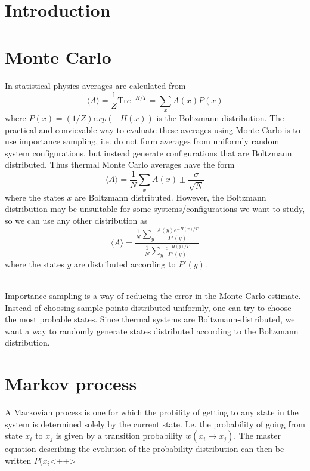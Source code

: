 \documentclass[a4paper]{article}
\newcommand{\trm}[1]{\textrm{#1}}
\begin{document}
\section{Introduction}
\section{Monte Carlo}
In statistical physics averages are calculated from 
\begin{equation}
  \langle A\rangle = \frac{1}{Z}\trm{Tr} e^{-H/T} = \sum_x A(x) P(x)
  \label{}
\end{equation}
where  $P(x) = (1/Z)exp(-H(x))$ is the Boltzmann distribution.
The practical and convievable way to evaluate these averages using Monte Carlo is to use importance sampling, i.e. do not form averages from uniformly random system configurations, but instead generate configurations that are Boltzmann distributed.   
Thus thermal Monte Carlo averages have the form 
\begin{equation}
  \langle A \rangle = \frac{1}{N} \sum_x A(x) \pm \frac{\sigma	}{\sqrt N}
  \label{}
\end{equation}
where the states $x$ are Boltzmann distributed.
However, the Boltzmann distribution may be unsuitable for some systems/configurations we want to study, so we can use any other distribution as 
\begin{equation}
  \langle A \rangle = \frac{\frac{1}{N}\sum_y \frac{A(y) e^{-H(x)/T}}{P'(y)}}{\frac{1}{N}\sum_y \frac{e^{-H(y)/T}}{P'(y)}}  
  \label{}
\end{equation}
 where the states $y$ are distributed according to $P'(y)$.

 \\
 Importance sampling is a way of reducing the error in the Monte Carlo estimate. Instead of choosing sample points distributed uniformly, one can try to choose the most probable states. Since thermal systems are Boltzmann-distributed, we want a way to randomly generate states distributed according to the Boltzmann distribution.
 \section{Markov process}
 A Markovian process is one for which the probility of getting to any state in the system is determined solely by the current state. I.e. the probability of going from state $x_i$ to $x_{j}$ is given by a transition probability $w(x_i \rightarrow x_j)$. The master equation describing the evolution of the probability distribution can then be written $P(x_i $<++>
 
\end{document}
